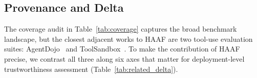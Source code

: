 \begin{table}[!htbp]
\centering
\caption{Coverage audit of selected benchmarks. $\checkmark$ = primary, $\triangle$ = partial, $\times$ = minimal (based on qualitative expert assessment).}
\label{tab:coverage}
\small
\setlength{\tabcolsep}{3pt}
\end{table}

\subsection{Provenance and Delta}
\label{subsec:provenance_delta}

The coverage audit in Table~\ref{tab:coverage} captures the broad benchmark landscape, but the closest adjacent works to HAAF are two tool-use evaluation suites: AgentDojo~\cite{debenedetti2024agentdojo} and ToolSandbox~\cite{lu2024toolsandbox}. To make the contribution of HAAF precise, we contrast all three along six axes that matter for deployment-level trustworthiness assessment (Table~\ref{tab:related_delta}).

